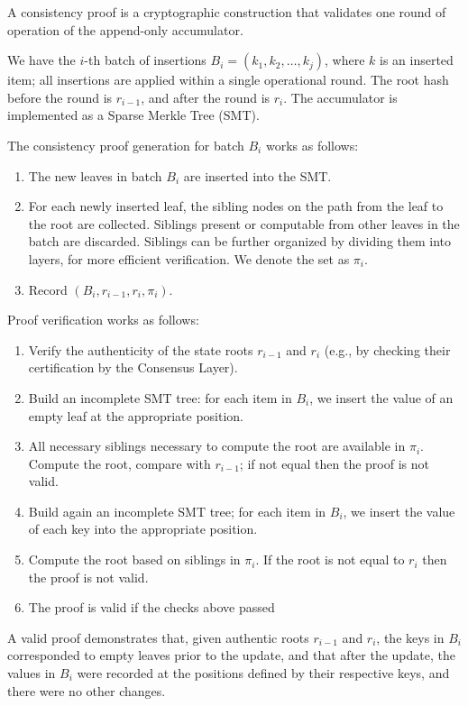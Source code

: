 \documentclass[twocolumn]{article}
\begin{document}
A consistency proof is a cryptographic construction that validates one round of operation of  the append-only accumulator.

We have the $i$-th batch of insertions $B_i = (k_1, k_2, \dots, k_j)$, where $k$ is an inserted item; all insertions are applied within a single operational round. The root hash before the round is $r_{i-1}$, and after the round is $r_i$. The accumulator is implemented as a Sparse Merkle Tree (SMT).

The consistency proof generation for batch $B_i$ works as follows:

\begin{enumerate}
    \item The new leaves in batch $B_i$ are inserted into the SMT.
    \item For each newly inserted leaf, the sibling nodes on the path from the leaf to the root are collected. Siblings present or computable from other leaves in the batch are discarded. Siblings can be further organized by dividing them into layers, for more efficient verification. We denote the set as $\pi_i$.
    \item Record $(B_i, r_{i-1}, r_i, \pi_i)$.
\end{enumerate}

Proof verification works as follows:

\begin{enumerate}
    \item Verify the authenticity of the state roots $r_{i-1}$ and $r_i$ (e.g., by checking their certification by the Consensus Layer).
    \item Build an incomplete SMT tree: for each item in $B_i$, we insert the value of an empty leaf at the appropriate position.
    \item All necessary siblings necessary to compute the root are available in $\pi_i$. Compute the root, compare with $r_{i-1}$; if not equal then the proof is not valid.
    \item Build again an incomplete SMT tree; for each item in $B_i$, we insert the value of each key into the appropriate position.
    \item Compute the root based on siblings in $\pi_i$. If the root is not equal to $r_i$ then the proof is not valid.
    \item The proof is valid if the checks above passed
\end{enumerate}

A valid proof demonstrates that, given authentic roots $r_{i-1}$ and $r_i$, the keys in $B_i$ corresponded to empty leaves prior to the update, and that after the update, the values in $B_i$ were recorded at the positions defined by their respective keys, and there were no other changes.
\end{document}
